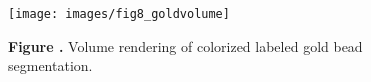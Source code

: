 \documentclass{frontiersMED} %
\begin{document}
\begin{figure}
\begin{center}
\texttt{[image: images/fig8\_goldvolume]}
\end{center}
 \textbf{\label{fig:08} Figure
   .}{ Volume rendering of colorized labeled gold bead segmentation. }
\end{figure}




\end{document}
